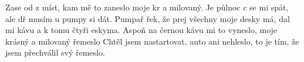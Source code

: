 
\zs

Zase od z míst, kam mě to zaneslo
moje kr a milovaný.
\ks
\zr
Je půlnoc c se mi spát,
ale dř musím u pumpy si  dát.
\kr
\zs
Pumpař řek, že prej všechny moje desky má,
dal mi kávu a k tomu čtyři eskyma.
\ks
\zr     \kr
\zs
Aspoň na černou kávu mi to vyneslo,
moje krásný a milovaný řemeslo
\ks
\zr     \kr
\zs
Chtěl jsem nastartovat, auto ani nehleslo,
to je tím, že jsem přechválil svý řemeslo.
\ks
\zr     \kr
\kp


